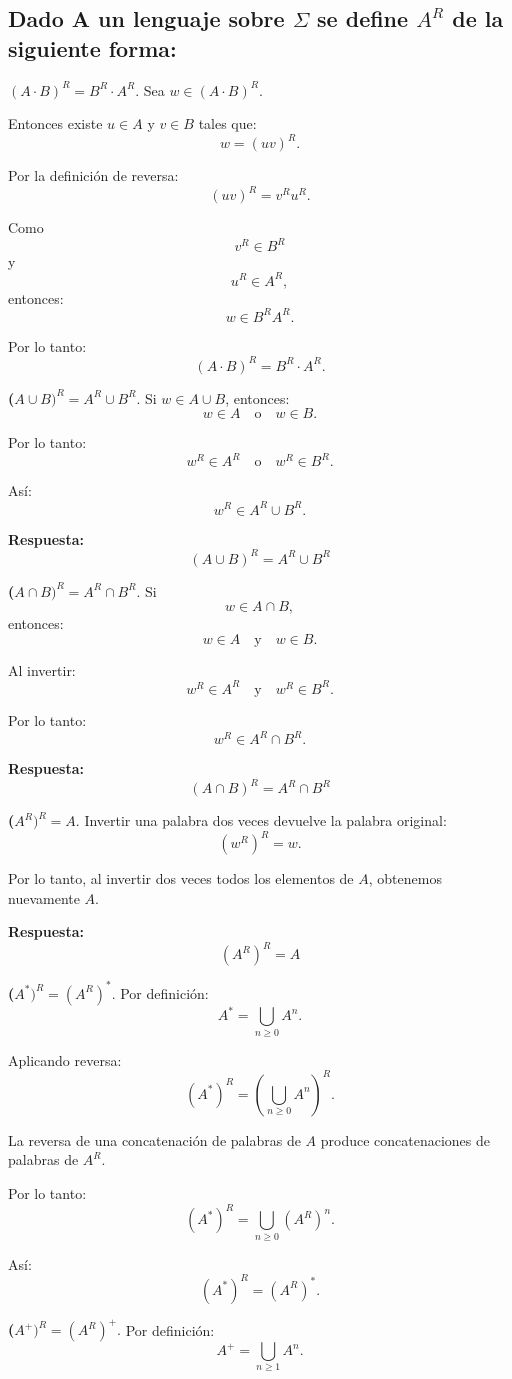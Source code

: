 \documentclass[12pt]{article}
\begin{document}
\subsection{Dado A un lenguaje sobre $\Sigma$ se define $A^R$ de la siguiente forma:}
 
\textbf{$ (A\cdot B)^R=B^R\cdot A^R.$}
Sea $w\in(A\cdot B)^R$.

Entonces existe $u\in A$ y $v\in B$ tales que:
\[
w=(uv)^R.
\]

Por la definición de reversa:
\[
(uv)^R=v^Ru^R.
\]

Como
\[
v^R\in B^R
\]
y
\[
u^R\in A^R,
\]
entonces:
\[
w\in B^RA^R.
\]

Por lo tanto:
\[
\boxed{(A\cdot B)^R=B^R\cdot A^R}.
\]


\textbf{($A\cup B)^R=A^R\cup B^R.$}
Si $w\in A\cup B$, entonces:
\[
w\in A \quad\text{o}\quad w\in B.
\]

Por lo tanto:
\[
w^R\in A^R \quad\text{o}\quad w^R\in B^R.
\]

Así:
\[
w^R\in A^R\cup B^R.
\]

\textbf{Respuesta:}
\[
\boxed{(A\cup B)^R=A^R\cup B^R}
\]

\textbf{($A\cap B)^R=A^R\cap B^R.$}
Si
\[
w\in A\cap B,
\]
entonces:
\[
w\in A
\quad\text{y}\quad
w\in B.
\]

Al invertir:
\[
w^R\in A^R
\quad\text{y}\quad
w^R\in B^R.
\]

Por lo tanto:
\[
w^R\in A^R\cap B^R.
\]

\textbf{Respuesta:}
\[
\boxed{(A\cap B)^R=A^R\cap B^R}
\]


\textbf{($A^R)^R=A.$}
Invertir una palabra dos veces devuelve la palabra original:
\[
(w^R)^R=w.
\]

Por lo tanto, al invertir dos veces todos los elementos de $A$,
obtenemos nuevamente $A$.

\textbf{Respuesta:}
\[
\boxed{(A^R)^R=A}
\]

\textbf{($A^*)^R=(A^R)^*.$}
Por definición:
\[
A^*=\bigcup_{n\geq0}A^n.
\]

Aplicando reversa:
\[
(A^*)^R=
\left(\bigcup_{n\geq0}A^n\right)^R.
\]

La reversa de una concatenación de palabras de $A$ produce
concatenaciones de palabras de $A^R$.

Por lo tanto:
\[
(A^*)^R=\bigcup_{n\geq0}(A^R)^n.
\]

Así:
\[
\boxed{(A^*)^R=(A^R)^*}.
\]

\textbf{($A^+)^R=(A^R)^+.$}
Por definición:
\[
A^+=\bigcup_{n\geq1}A^n.
\]
\end{document}

